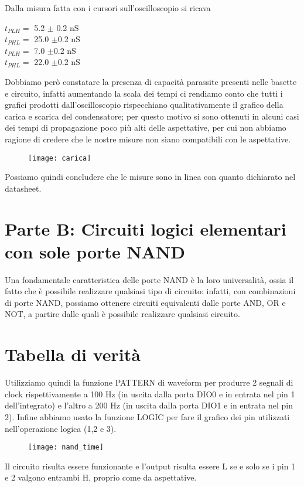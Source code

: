 \documentclass[10pt, a4paper, italian]{article}
\begin{document}
Dalla misura fatta con i cursori sull'oscilloscopio si ricava
\begin{multicols}{2}
    \centering
    $t_{PLH}=$ 5.2 $\pm$ 0.2 nS\\
    $t_{PHL}=$ 25.0 $\pm$0.2 nS\\
    
    
    $t_{PLH}=$ 7.0 $\pm$0.2 nS\\
    $t_{PHL}=$ 22.0 $\pm$0.2 nS\\
\end{multicols}
Dobbiamo però constatare la presenza di capacità parassite presenti nelle basette e circuito, infatti aumentando la scala dei tempi ci rendiamo conto che tutti i grafici prodotti dall'oscilloscopio rispecchiano qualitativamente il grafico della carica e scarica del condensatore; per questo motivo si sono ottenuti in alcuni casi dei tempi di propagazione poco più alti delle aspettative, per cui non abbiamo ragione di credere che le nostre misure non siano compatibili con le aspettative.
\begin{figure}
	\texttt{[image: carica]}
\end{figure}
Possiamo quindi concludere che le misure sono in linea con quanto dichiarato nel datasheet.

\setcounter{section}{3}
\section*{Parte B: Circuiti logici elementari con sole porte NAND}
Una fondamentale caratteristica delle porte NAND è la loro universalità, ossia il fatto che è possibile realizzare qualsiasi tipo di circuito: infatti, con combinazioni di porte NAND, possiamo ottenere circuiti equivalenti dalle porte AND, OR e NOT, a partire dalle quali è possibile realizzare qualsiasi circuito.

\begin{figure}[htbp]
    \label{fig: NAND}
\end{figure}

\section{Tabella di verità}
Utilizziamo quindi la funzione PATTERN di waveform per produrre 2 segnali di clock rispettivamente a 100 Hz (in uscita dalla porta DIO0 e in entrata nel pin 1 dell'integrato) e l'altro a 200 Hz (in uscita dalla porta DIO1 e in entrata nel pin 2). Infine abbiamo usato la funzione LOGIC per fare il grafico dei pin utilizzati nell'operazione logica (1,2 e 3). 
\begin{figure}[htbp]
\centering
	\texttt{[image: nand\_time]}
	\label{nand_time}
\end{figure}
Il circuito risulta essere funzionante e l'output risulta essere L se e solo se i pin 1 e 2 valgono entrambi H, proprio come da aspettative.
\end{document}
